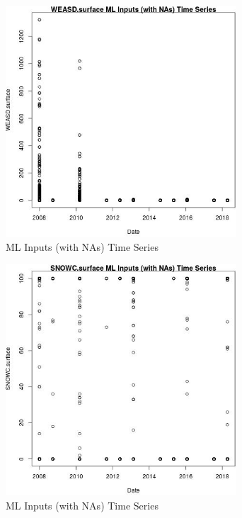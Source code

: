 \begin{figure} 
\centering  
\includegraphics[width=0.77\textwidth]{Code_Outputs/Report_ML_input_PM25_Step4_part_e_de_duplicated_aves_compiled_2019-05-18wNAs_WEASDsurfacevDate.jpg} 
\caption{\label{fig:Report_ML_input_PM25_Step4_part_e_de_duplicated_aves_compiled_2019-05-18wNAsWEASDsurfacevDate}ML Inputs (with NAs) Time Series} 
\end{figure} 
 

\clearpage 

\begin{figure} 
\centering  
\includegraphics[width=0.77\textwidth]{Code_Outputs/Report_ML_input_PM25_Step4_part_e_de_duplicated_aves_compiled_2019-05-18wNAs_SNOWCsurfacevDate.jpg} 
\caption{\label{fig:Report_ML_input_PM25_Step4_part_e_de_duplicated_aves_compiled_2019-05-18wNAsSNOWCsurfacevDate}ML Inputs (with NAs) Time Series} 
\end{figure} 
 

